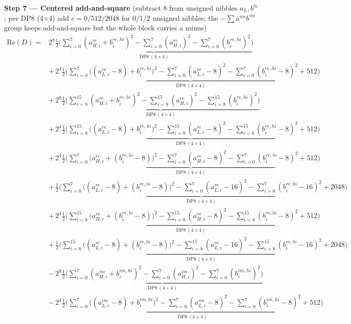 \documentclass[fleqn]{article}
\newcommand{\DPop}[3]{\mathrm{DP#1}\,(#2\!\times\!#3)}
\begin{document}
\textbf{Step 7 --- Centered add-and-square}\quad
{\small(subtract $8$ from unsigned nibbles $a_L,b^{lo}$; per DP8 (4$\times$4) add $c=0/512/2048$ for 0/1/2 unsigned nibbles; the $-\sum a^{im}b^{im}$ group keeps add-and-square but the whole block carries a minus)}
\begin{align*}
\mathrm{Re}(D) = {}
  & 2^{8}\underbrace{\tfrac12\Big(\sum_{i=0}^{7}(a_{H,i}^{re}{+}b_i^{re,hi})^2 - \sum_{i=0}^{7}(a_{H,i}^{re})^2 - \sum_{i=0}^{7}(b_i^{re,hi})^2\Big)}_{\DPop{8}{4}{4}} \\[0.6em]
  & +\, 2^{4}\underbrace{\tfrac12\Big(\sum_{i=0}^{7}\big((a_{L,i}^{re}{-}8){+}b_i^{re,hi}\big)^2 - \sum_{i=0}^{7}(a_{L,i}^{re}{-}8)^2 - \sum_{i=0}^{7}(b_i^{re,hi}{-}8)^2 + 512\Big)}_{\DPop{8}{4}{4}} \\[0.6em]
  & +\, 2^{8}\underbrace{\tfrac12\Big(\sum_{i=8}^{15}(a_{H,i}^{re}{+}b_i^{re,hi})^2 - \sum_{i=8}^{15}(a_{H,i}^{re})^2 - \sum_{i=8}^{15}(b_i^{re,hi})^2\Big)}_{\DPop{8}{4}{4}} \\[0.6em]
  & +\, 2^{4}\underbrace{\tfrac12\Big(\sum_{i=8}^{15}\big((a_{L,i}^{re}{-}8){+}b_i^{re,hi}\big)^2 - \sum_{i=8}^{15}(a_{L,i}^{re}{-}8)^2 - \sum_{i=8}^{15}(b_i^{re,hi}{-}8)^2 + 512\Big)}_{\DPop{8}{4}{4}} \\[0.6em]
  & +\, 2^{4}\underbrace{\tfrac12\Big(\sum_{i=0}^{7}\big(a_{H,i}^{re}{+}(b_i^{re,lo}{-}8)\big)^2 - \sum_{i=0}^{7}(a_{H,i}^{re}{-}8)^2 - \sum_{i=0}^{7}(b_i^{re,lo}{-}8)^2 + 512\Big)}_{\DPop{8}{4}{4}} \\[0.6em]
  & +\, \underbrace{\tfrac12\Big(\sum_{i=0}^{7}\big((a_{L,i}^{re}{-}8){+}(b_i^{re,lo}{-}8)\big)^2 - \sum_{i=0}^{7}(a_{L,i}^{re}{-}16)^2 - \sum_{i=0}^{7}(b_i^{re,lo}{-}16)^2 + 2048\Big)}_{\DPop{8}{4}{4}} \\[0.6em]
  & +\, 2^{4}\underbrace{\tfrac12\Big(\sum_{i=8}^{15}\big(a_{H,i}^{re}{+}(b_i^{re,lo}{-}8)\big)^2 - \sum_{i=8}^{15}(a_{H,i}^{re}{-}8)^2 - \sum_{i=8}^{15}(b_i^{re,lo}{-}8)^2 + 512\Big)}_{\DPop{8}{4}{4}} \\[0.6em]
  & +\, \underbrace{\tfrac12\Big(\sum_{i=8}^{15}\big((a_{L,i}^{re}{-}8){+}(b_i^{re,lo}{-}8)\big)^2 - \sum_{i=8}^{15}(a_{L,i}^{re}{-}16)^2 - \sum_{i=8}^{15}(b_i^{re,lo}{-}16)^2 + 2048\Big)}_{\DPop{8}{4}{4}} \\[0.6em]
  & -\, 2^{8}\underbrace{\tfrac12\Big(\sum_{i=0}^{7}(a_{H,i}^{im}{+}b_i^{im,hi})^2 - \sum_{i=0}^{7}(a_{H,i}^{im})^2 - \sum_{i=0}^{7}(b_i^{im,hi})^2\Big)}_{\DPop{8}{4}{4}} \\[0.6em]
  & -\, 2^{4}\underbrace{\tfrac12\Big(\sum_{i=0}^{7}\big((a_{L,i}^{im}{-}8){+}b_i^{im,hi}\big)^2 - \sum_{i=0}^{7}(a_{L,i}^{im}{-}8)^2 - \sum_{i=0}^{7}(b_i^{im,hi}{-}8)^2 + 512\Big)}_{\DPop{8}{4}{4}} \\[0.6em]

\end{align*}
\end{document}
